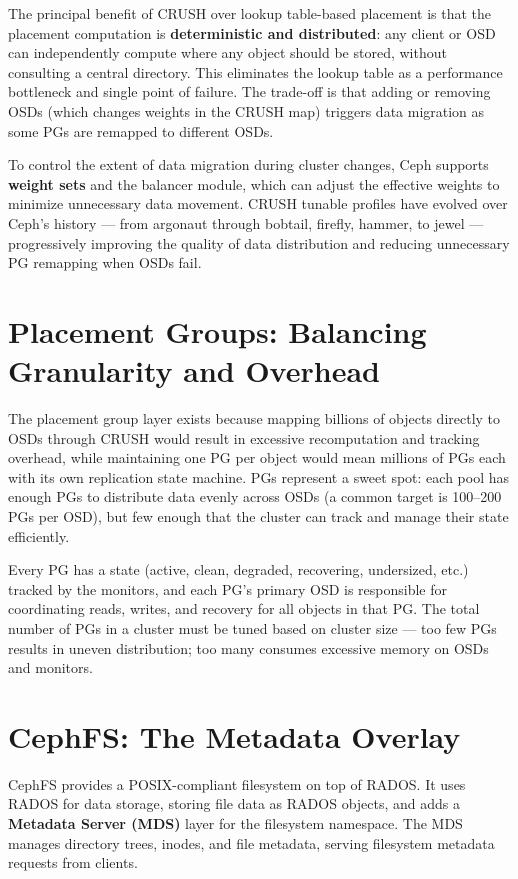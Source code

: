 The principal benefit of CRUSH over lookup table-based placement is that the placement computation is \textbf{deterministic and distributed}: any client or OSD can independently compute where any object should be stored, without consulting a central directory. This eliminates the lookup table as a performance bottleneck and single point of failure. The trade-off is that adding or removing OSDs (which changes weights in the CRUSH map) triggers data migration as some PGs are remapped to different OSDs.

To control the extent of data migration during cluster changes, Ceph supports \textbf{weight sets} and the balancer module, which can adjust the effective weights to minimize unnecessary data movement. CRUSH tunable profiles have evolved over Ceph's history --- from argonaut through bobtail, firefly, hammer, to jewel --- progressively improving the quality of data distribution and reducing unnecessary PG remapping when OSDs fail.

\section{Placement Groups: Balancing Granularity and Overhead}
The placement group layer exists because mapping billions of objects directly to OSDs through CRUSH would result in excessive recomputation and tracking overhead, while maintaining one PG per object would mean millions of PGs each with its own replication state machine. PGs represent a sweet spot: each pool has enough PGs to distribute data evenly across OSDs (a common target is 100--200 PGs per OSD), but few enough that the cluster can track and manage their state efficiently.

Every PG has a state (active, clean, degraded, recovering, undersized, etc.) tracked by the monitors, and each PG's primary OSD is responsible for coordinating reads, writes, and recovery for all objects in that PG. The total number of PGs in a cluster must be tuned based on cluster size --- too few PGs results in uneven distribution; too many consumes excessive memory on OSDs and monitors.

\section{CephFS: The Metadata Overlay}
CephFS provides a POSIX-compliant filesystem on top of RADOS. It uses RADOS for data storage, storing file data as RADOS objects, and adds a \textbf{Metadata Server (MDS)} layer for the filesystem namespace. The MDS manages directory trees, inodes, and file metadata, serving filesystem metadata requests from clients.

